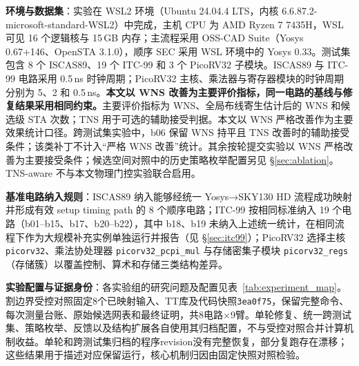 \documentclass[twocolumn,10pt,fontset=windows]{ctexart}
\begin{document}
\textbf{环境与数据集}：实验在 WSL2 环境（Ubuntu 24.04.4 LTS，内核 6.6.87.2-microsoft-standard-WSL2）中完成，主机 CPU 为 AMD Ryzen 7 7435H，WSL 可见 16 个逻辑核与 15\,GB 内存；主流程采用 OSS-CAD Suite（Yosys 0.67+146、OpenSTA 3.1.0），顺序 SEC 采用 WSL 环境中的 Yosys 0.33。测试集包含 8 个 ISCAS89、19 个 ITC-99 和 3 个 PicoRV32 子模块。ISCAS89 与 ITC-99 电路采用 0.5\,ns 时钟周期；PicoRV32 主核、乘法器与寄存器模块的时钟周期分别为 5、2 和 0.5\,ns。\textbf{本文以 WNS 改善为主要评价指标，同一电路的基线与修复结果采用相同约束。}主要评价指标为 WNS、全局布线寄生估计后的 WNS 和候选级 STA 次数；TNS 用于可选的辅助接受判据。本文以 WNS 严格改善作为主要效果统计口径。跨测试集实验中，b06 保留 WNS 持平且 TNS 改善时的辅助接受条件；该类补丁不计入“严格 WNS 改善”统计。其余按轮提交实验以 WNS 严格改善为主要接受条件；候选空间对照中的历史策略枚举配置另见 \S\ref{sec:ablation}。TNS-aware 不与本文物理门控实验联合启用。

\textbf{基准电路纳入规则}：ISCAS89 纳入能够经统一 Yosys→SKY130 HD 流程成功映射并形成有效 setup timing path 的 8 个顺序电路；ITC-99 按相同标准纳入 19 个电路（b01--b15、b17、b20--b22），其中 b18、b19 未纳入上述统一统计，在相同流程下作为大规模补充实例单独运行并报告（见 \S\ref{sec:itc99}）；PicoRV32 选择主核 \texttt{picorv32}、乘法协处理器 \texttt{picorv32\_pcpi\_mul} 与存储密集子模块 \texttt{picorv32\_regs}（存储簇）以覆盖控制、算术和存储三类结构差异。

\textbf{实验配置与证据身份}：各实验组的研究问题及配置见表~\ref{tab:experiment_map}。割边界受控对照固定8个已映射输入、TT库及代码快照\texttt{3ea0f75}，保留完整命令、每次测量台账、原始候选网表和最终证明，共8电路$\times$9臂。单轮修复、统一跨测试集、策略枚举、反馈以及结构扩展各自使用其归档配置，不与受控对照合并计算机制收益。单轮和跨测试集归档的程序revision没有完整恢复，部分复跑存在漂移；这些结果用于描述对应保留运行，核心机制归因由固定快照对照检验。
\end{document}
